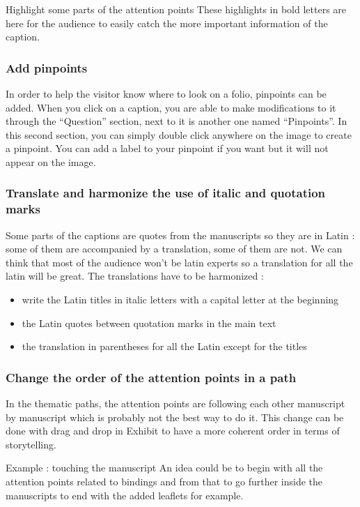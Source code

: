     Highlight some parts of the attention points
    These highlights in bold letters are here for the audience to easily catch the more important information of the caption.

    \subsubsection{Add pinpoints}
    In order to help the visitor know where to look on a folio, pinpoints can be added. When you click on a caption, you are able to make modifications to it through the “Question” section, next to it is another one named “Pinpoints”. In this second section, you can simply double click anywhere on the image to create a pinpoint. You can add a label to your pinpoint if you want but it will not appear on the image. 

    \subsubsection{Translate and harmonize the use of italic and quotation marks}
    Some parts of the captions are quotes from the manuscripts so they are in Latin : some of them are accompanied by a translation, some of them are not. We can think that most of the audience won’t be latin experts so a translation for all the latin will be great. 
    The translations have to be harmonized : 
    \begin{itemize}
        \item write the Latin titles in italic letters with a capital letter at the beginning
        \item the Latin quotes between quotation marks in the main text
        \item the translation in parentheses for all the Latin except for the titles
    \end{itemize}

    \subsubsection{Change the order of the attention points in a path}
    In the thematic paths, the attention points are following each other manuscript by manuscript which is probably not the best way to do it. This change can be done with drag and drop in Exhibit to have a more coherent order in terms of storytelling. 

    Example : touching the manuscript 
    An idea could be to begin with all the attention points related to bindings and from that to go further inside the manuscripts to end with the added leaflets for example. 

